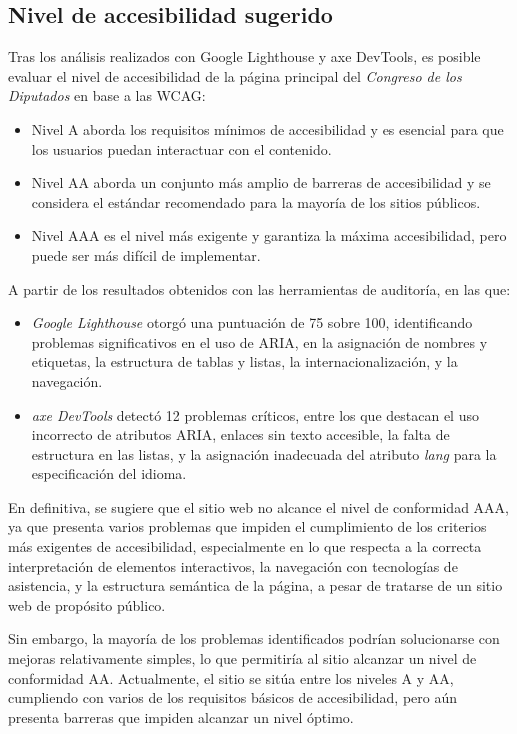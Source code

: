 \documentclass[]{article}
\begin{document}
\subsection{Nivel de accesibilidad sugerido}
Tras los análisis realizados con Google Lighthouse y axe DevTools, es posible evaluar el nivel de accesibilidad de la página principal del \textit{Congreso de los Diputados} en base a las WCAG:
\begin{itemize}
	\item Nivel A aborda los requisitos mínimos de accesibilidad y es esencial para que los usuarios puedan interactuar con el contenido.
	\item Nivel AA aborda un conjunto más amplio de barreras de accesibilidad y se considera el estándar recomendado para la mayoría de los sitios públicos.
	\item Nivel AAA es el nivel más exigente y garantiza la máxima accesibilidad, pero puede ser más difícil de implementar.
\end{itemize}

A partir de los resultados obtenidos con las herramientas de auditoría, en las que:
\begin{itemize}
	\item \textit{Google Lighthouse} otorgó una puntuación de 75 sobre 100, identificando problemas significativos en el uso de ARIA, en la asignación de nombres y etiquetas, la estructura de tablas y listas, la internacionalización, y la navegación.
	\item \textit{axe DevTools} detectó 12 problemas críticos, entre los que destacan el uso incorrecto de atributos ARIA, enlaces sin texto accesible, la falta de estructura en las listas, y la asignación inadecuada del atributo \textit{lang} para la especificación del idioma.
\end{itemize}

En definitiva, se sugiere que el sitio web no alcance el nivel de conformidad AAA, ya que presenta varios problemas que impiden el cumplimiento de los criterios más exigentes de accesibilidad, especialmente en lo que respecta a la correcta interpretación de elementos interactivos, la navegación con tecnologías de asistencia, y la estructura semántica de la página, a pesar de tratarse de un sitio web de propósito público. 

Sin embargo, la mayoría de los problemas identificados podrían solucionarse con mejoras relativamente simples, lo que permitiría al sitio alcanzar un nivel de conformidad AA. Actualmente, el sitio se sitúa entre los niveles A y AA, cumpliendo con varios de los requisitos básicos de accesibilidad, pero aún presenta barreras que impiden alcanzar un nivel óptimo. 
\end{document}
